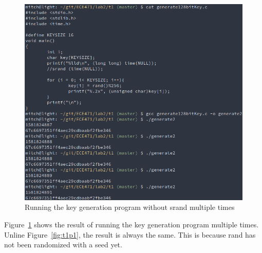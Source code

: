 \documentclass[12pt]{article}
\begin{document}
\begin{figure}[H]
    \begin{center}
        \includegraphics[scale=0.6]{t1p2.png}
    \end{center}{}
    \caption{Running the key generation program without srand multiple times}
    \label{fig:t1p2}
\end{figure}

Figure~\ref{fig:t1p2} shows the result of running the key generation program multiple times. Unline Figure~\ref{fig:t1p1}, the result is always the same. This is because rand has not been randomized with a seed yet.
\end{document}
